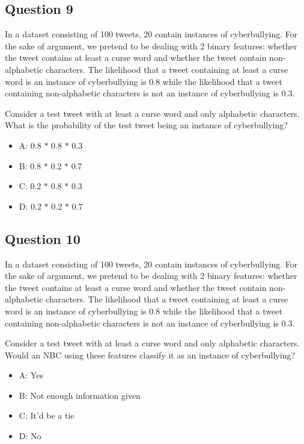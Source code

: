 \documentclass[
  11pt,
  british,
]{article}
\providecommand{\tightlist}{%
  \setlength{\itemsep}{0pt}\setlength{\parskip}{0pt}}
\begin{document}
\hypertarget{question-9}{%
\subsection{Question 9}\label{question-9}}

In a dataset consisting of 100 tweets, 20 contain instances of
cyberbullying. For the sake of argument, we pretend to be dealing with 2
binary features: whether the tweet contains at least a curse word and
whether the tweet contain non-alphabetic characters. The likelihood that
a tweet containing at least a curse word is an instance of cyberbullying
is 0.8 while the likelihood that a tweet containing non-alphabetic
characters is not an instance of cyberbullying is 0.3.

Consider a test tweet with at least a curse word and only alphabetic
characters. What is the probability of the test tweet being an instance
of cyberbullying?

\begin{itemize}
\tightlist
\item
  A: 0.8 \(*\) 0.8 \(*\) 0.3
\item
  B: 0.8 \(*\) 0.2 \(*\) 0.7
\item
  C: 0.2 \(*\) 0.8 \(*\) 0.3
\item
  D: 0.2 \(*\) 0.2 \(*\) 0.7
\end{itemize}

\hypertarget{question-10}{%
\subsection{Question 10}\label{question-10}}

In a dataset consisting of 100 tweets, 20 contain instances of
cyberbullying. For the sake of argument, we pretend to be dealing with 2
binary features: whether the tweet contains at least a curse word and
whether the tweet contain non-alphabetic characters. The likelihood that
a tweet containing at least a curse word is an instance of cyberbullying
is 0.8 while the likelihood that a tweet containing non-alphabetic
characters is not an instance of cyberbullying is 0.3.

Consider a test tweet with at least a curse word and only alphabetic
characters. Would an NBC using these features classify it as an instance
of cyberbullying?

\begin{itemize}
\tightlist
\item
  A: Yes
\item
  B: Not enough information given
\item
  C: It'd be a tie
\item
  D: No
\end{itemize}
\end{document}
